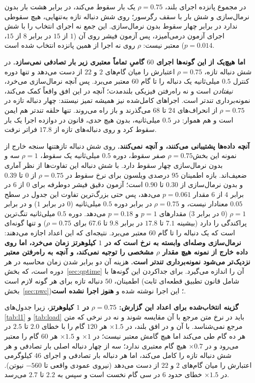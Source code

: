 \documentclass[10pt,twocolumn]{article}
\newcommand{\en}[1]{\lr{#1}}
\newcommand{\md}{\lr{\textemdash}}
\begin{document}
در مجموع پانزده اجرای بلند، $\rho=0.75$ یک بار سقوط می‌کند، در برابر هشت بار بدون
نرمال‌سازی و شش بار با سقف رگرسور؛ روی شش دنباله تازه به‌تنهایی، هیچ سقوطی ندارد در
برابر چهار سقوط بدون نرمال‌سازی. این جمع نه اجرای انتخاب را با شش اجرای آزمون
درمی‌آمیزد، پس آزمون فیشر روی آن ($1$ از $15$ در برابر $8$ از $15$، $p=0.014$) معتبر نیست:
$\rho$ روی نه اجرا از همین پانزده انتخاب شده است.

\textbf{اما هیچ‌یک از این گونه‌ها اجرای $60$ گامیِ تماماً معتبری زیر بار تصادفی
نمی‌سازد.} در شش دنباله تازه، $\rho=0.75$ اعتبارش را میان گام‌های $2$ و $22$ از دست
می‌دهد و تنها دوره کنترل $0.5$ میلی‌ثانیه یک دنباله را تا گام $60$ معتبر می‌برد. پس
آنچه نرمال‌سازی می‌خرد، \emph{نیفتادن} است و نه راه‌رفتن فیزیکی بلندمدت؛ آنچه در این
افق واقعاً کمک می‌کند، نمونه‌برداری تندتر است. اجراهای کامل‌شده نیز همیشه تمیز
نیستند: چهار دنباله تازه در $\rho=0.75$ از انحراف‌های $24$ تا $68$ می‌گذرند و باز راه
می‌روند. تنها حلقه تندتر هم ایمن است و هم
هموار: در $0.5$ میلی‌ثانیه، بدون هیچ حدی، قانون در دوازده اجرا یک بار سقوط کرد و روی
دنباله‌های تازه از $17.8$ فراتر نرفت.

\textbf{آنچه داده‌ها پشتیبانی می‌کنند، و آنچه نمی‌کنند.} روی شش دنباله تازه\md{}تنها سنجه
خارج از نمونه این بخش\md{}$\rho=0.75$ صفر سقوط، دوره $0.5$ میلی‌ثانیه یک سقوط، $\rho=1$ سه
و بدون نرمال‌سازی چهار سقوط دارد. با شش دنباله این تفاوت‌ها از نظر آماری ضعیف‌اند. بازه
اطمینان $95$ درصدی ویلسون برای نرخ سقوط در $\rho=0.75$ از $0$ تا $0.39$ و بدون نرمال‌سازی از
$0.30$ تا $0.90$ است؛ آزمون دقیق فیشر دوطرفه برای $0$ از $6$ در برابر $4$ از $6$ مقدار
$p=0.061$ می‌دهد، پس حتی بزرگ‌ترین تفاوت این جدول در سطح $0.05$ معنادار نیست، و $\rho=0.75$
در برابر دوره $0.5$ میلی‌ثانیه ($0$ در برابر $1$) و در برابر $\rho=1$ ($0$ در برابر $3$)
مقدارهای $p=1$ و $p=0.18$ می‌دهد. دوره $0.5$ میلی‌ثانیه تنگ‌ترین پراکندگی را دارد
(بیشینه $7.1$ تا $17.8$ در برابر $9.8$ تا $67.6$ برای $\rho=0.75$) و تنها گونه‌ای است که
یک دنباله را تا گام $60$ معتبر می‌برد. نتیجه‌ای که این اعداد اجازه می‌دهند:
\textbf{نرمال‌سازی وصله‌ای وابسته به نرخ است که در $1$ کیلوهرتز زمان می‌خرد، اما روی داده
خارج از نمونه هیچ مقدار $\rho$ مشخصی را توجیه نمی‌کند، و آنچه به راه‌رفتن معتبر نزدیک‌تر
می‌شود نمونه‌برداری تندتر است.} هزینه آن دو برابر شدن زمان محاسبه در هر دوره است، که
بخش~\ref{sec:qptime} آن را اندازه می‌گیرد. برای جداکردن این گونه‌ها با اطمینان، $50$ دنباله
تازه برای هر گونه لازم است (شامل قانون تطبیق قطعه‌ای ثابت بخش~\ref{sec:pwc})؛ این اجرا
نوشته شده و \textbf{هنوز اجرا نشده است}.

\textbf{گزینه انتخاب‌شده برای اعداد این گزارش: $\rho=0.75$ در $1$ کیلوهرتز}، زیرا
جدول‌های \ref{tab:l1} و \ref{tab:load} باید در نرخ متن مرجع با آن مقایسه شوند و نه
در نرخی که متن مرجع نمی‌شناسد. با آن و در افق بلند، \en{B} در $\times1.5$ هر $120$ گام را با
خطای $2.0$ تا $2.5$ در هر ده گام طی می‌کند اما هیچ گامش معتبر نیست؛ \en{C} در $\times1$ و
$\times1.5$ هر $60$ گام را معتبر می‌رود و در $\times0.7$ هیچ گام معتبری ندارد؛ سه از چهار
دنباله اصلی بار تصادفی و هر شش دنباله تازه را کامل می‌کند، اما هر دنباله بار تصادفی و
اجرای $46$ کیلوگرمی اعتبارش را میان گام‌های $2$ و $22$ از دست می‌دهد (نیروی عمودی واقعی تا
$-560$ نیوتن). در $\times1.5$ خطای \en{C} حدود $6$ در سی گام نخست است و سپس به $2.2$ تا
$2.7$ می‌رسد.
\end{document}
